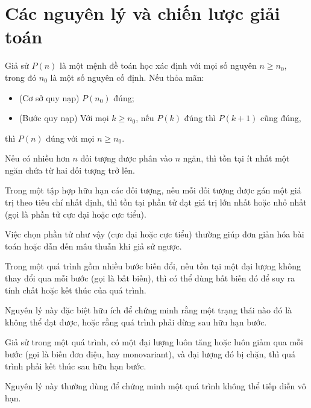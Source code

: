 \documentclass[../imo-training-open-book.tex]{subfiles}
\begin{document}
\section{Các nguyên lý và chiến lược giải toán}

\begin{theorem}
    \label{theorem:induction-principle}
    Giả sử \(P(n)\) là một mệnh đề toán học xác định với mọi số nguyên \(n \ge n_0\), trong đó \(n_0\) là một số nguyên cố định. Nếu thỏa mãn:
    \begin{itemize}[topsep=0pt, partopsep=0pt, itemsep=0pt]
        \item (Cơ sở quy nạp) \(P(n_0)\) đúng;
        \item (Bước quy nạp) Với mọi \(k \ge n_0\), nếu \(P(k)\) đúng thì \(P(k+1)\) cũng đúng,
    \end{itemize}
    thì \(P(n)\) đúng với mọi \(n \ge n_0\).
\end{theorem}

\begin{theorem}
    \label{theorem:pigeonhole-principle}
    Nếu có nhiều hơn \( n \) đối tượng được phân vào \( n \) ngăn, thì tồn tại ít nhất một ngăn chứa từ hai đối tượng trở lên.
\end{theorem}

\begin{theorem}
    \label{theorem:extremal-principle}
    Trong một tập hợp hữu hạn các đối tượng, nếu mỗi đối tượng được gán một giá trị theo tiêu chí nhất định,
    thì tồn tại phần tử đạt giá trị lớn nhất hoặc nhỏ nhất (gọi là phần tử cực đại hoặc cực tiểu).
    
    Việc chọn phần tử như vậy (cực đại hoặc cực tiểu) thường giúp đơn giản hóa bài toán hoặc dẫn đến mâu thuẫn khi giả sử ngược.
\end{theorem}

\begin{theorem}
    \label{theorem:invariant-principle}
    Trong một quá trình gồm nhiều bước biến đổi, nếu tồn tại một đại lượng không thay đổi qua mỗi bước (gọi là bất biến),
    thì có thể dùng bất biến đó để suy ra tính chất hoặc kết thúc của quá trình.
    
    Nguyên lý này đặc biệt hữu ích để chứng minh rằng một trạng thái nào đó là không thể đạt được, hoặc rằng quá trình phải dừng sau hữu hạn bước.
\end{theorem}

\begin{theorem}
    \label{theorem:monovariant-principle}
    Giả sử trong một quá trình, có một đại lượng luôn tăng hoặc luôn giảm qua mỗi bước (gọi là biến đơn điệu, hay monovariant),
    và đại lượng đó bị chặn, thì quá trình phải kết thúc sau hữu hạn bước.
    
    Nguyên lý này thường dùng để chứng minh một quá trình không thể tiếp diễn vô hạn.
\end{theorem}
\end{document}

